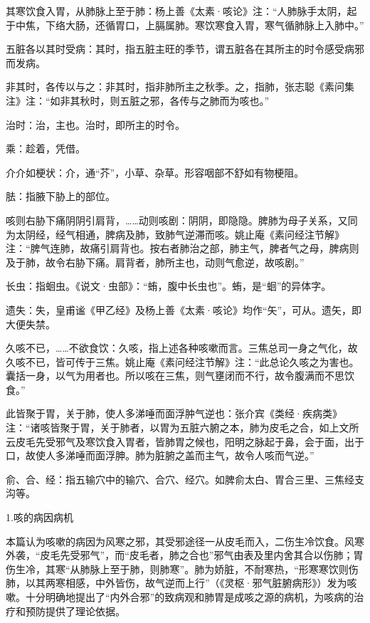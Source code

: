 \documentclass[draft,12pt]{ctexbook}
\begin{document}
\begin{jiaozhu}
  \item 其寒饮食入胃，从肺脉上至于肺：杨上善《太素·咳论》注：“人肺脉手太阴，起于中焦，下络大肠，还循胃口，上膈属肺。寒饮寒食入胃，寒气循肺脉上入肺中。”
  \item 五脏各以其时受病：其时，指五脏主旺的季节，谓五脏各在其所主的时令感受病邪而发病。
  \item 非其时，各传以与之：非其时，指非肺所主之秋季。之，指肺，张志聪《素问集注》注：“如非其秋时，则五脏之邪，各传与之肺而为咳也。”
  \item 治时：治，主也。治时，即所主的时令。
  \item 乘：趁着，凭借。
  \item 介介如梗状：介，通“芥”，小草、杂草。形容咽部不舒如有物梗阻。
  \item 胠：指腋下胁上的部位。
  \item 咳则右胁下痛阴阴引肩背，……动则咳剧：阴阴，即隐隐。脾肺为母子关系，又同为太阴经，经气相通，脾病及肺，致肺气逆滞而咳。姚止庵《素问经注节解》注：“脾气连肺，故痛引肩背也。按右者肺治之部，肺主气，脾者气之母，脾病则及于肺，故令右胁下痛。肩背者，肺所主也，动则气愈逆，故咳剧。”
  \item 长虫：指蛔虫。《说文·虫部》：“蛕，腹中长虫也”。蛕，是“蛔”的异体字。
  \item 遗失：失，皇甫谧《甲乙经》及杨上善《太素·咳论》均作“矢”，可从。遗矢，即大便失禁。
  \item 久咳不已，……不欲食饮：久咳，指上述各种咳嗽而言。三焦总司一身之气化，故久咳不已，皆可传于三焦。姚止庵《素问经注节解》注：“此总论久咳之为害也。囊括一身，以气为用者也。所以咳在三焦，则气壅闭而不行，故令腹满而不思饮食。”
  \item 此皆聚于胃，关于肺，使人多涕唾而面浮肿气逆也：张介宾《类经·疾病类》注：“诸咳皆聚于胃，关于肺者，以胃为五脏六腑之本，肺为皮毛之合，如上文所云皮毛先受邪气及寒饮食入胃者，皆肺胃之候也，阳明之脉起于鼻，会于面，出于口，故使人多涕唾而面浮胂。肺为脏腑之盖而主气，故令人咳而气逆。”
  \item 俞、合、经：指五输穴中的输穴、合穴、经穴。如脾俞太白、胃合三里、三焦经支沟等。
\end{jiaozhu}


1.咳的病因病机

本篇认为咳嗽的病因为风寒之邪，其受邪途径一从皮毛而入，二伤生冷饮食。风寒外袭，“皮毛先受邪气”，而“皮毛者，肺之合也”邪气由表及里内舍其合以伤肺；胃伤生冷，其寒“从肺脉上至于肺，则肺寒”。肺为娇脏，不耐寒热，“形寒寒饮则伤肺，以其两寒相感，中外皆伤，故气逆而上行”（《灵枢·邪气脏腑病形》）发为咳嗽。十分明确地提出了“内外合邪”的致病观和肺胃是成咳之源的病机，为咳病的治疗和预防提供了理论依据。
\end{document}
